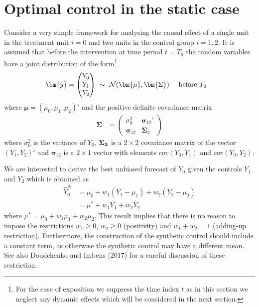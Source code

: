 \documentclass[12pt,a4paper]{article}
\begin{document}
\section{Optimal control in the static case}
%
Consider a very simple framework for analysing the causal effect of a single unit in the treatment unit $i=0$ and two units in the control group $i=1,2$. It is assumed that before the intervention at time period $t=T_0$ the random variables have a joint distribution of the form\footnote{For the ease of exposition we suppress the time index $t$ as in this section we neglect any dynamic effects which will be considered in the next section.}
\begin{align*}
\bm{y} &= \begin{pmatrix} Y_0 \\ Y_1 \\ Y_2 \end{pmatrix}   ~\sim ~ {\cal N}(\bm{\mu},\bm{\Sigma}) \quad  \text{ before } T_0
\end{align*}
where $\bm{\mu} = (\mu_0,\mu_1,\mu_2)'$ and the positive definite covariance matrix
\begin{align*}
\bm{\Sigma} &= \begin{pmatrix} \sigma_0^2 & \bm{\sigma}_{12}' \\ \bm{\sigma}_{12} & \bm{\Sigma}_2 \end{pmatrix}
\end{align*}
where $\sigma_0^2$ is the variance of $Y_0$, $\bf{\Sigma}_2$ is a $2\times 2$ covariance matrix of the vector $(Y_1, Y_2)'$ and $\bm{\sigma}_{12}$ is a $2\times 1$ vector with elements $cov(Y_0,Y_1)$ and $cov(Y_0,Y_2)$.

We are interested to derive the best unbiased forecast of $Y_0$ given the controls $Y_1$ and $Y_2$ which is obtained as
\begin{align*}
\widehat Y_0^N &= \mu_0 + w_1 (Y_1-\mu_1) + w_2 (Y_2-\mu_2) \\
&= \mu^* + w_1 Y_1 + w_2 Y_2
\end{align*}
where $\mu^*=\mu_0 + w_1\mu_1 + w_2\mu_2$. This result implies that there is no reason to impose the restrictions $w_1 \ge 0$, $w_2\ge 0$ (positivity) and $w_1+w_2=1$ (adding-up restriction). Furthermore, the construction of the synthetic control should include a constant term, as otherwise the synthetic control may have a different mean. See also Doudchenko and Imbens (2017) for a careful discussion of these restriction.
\end{document}
